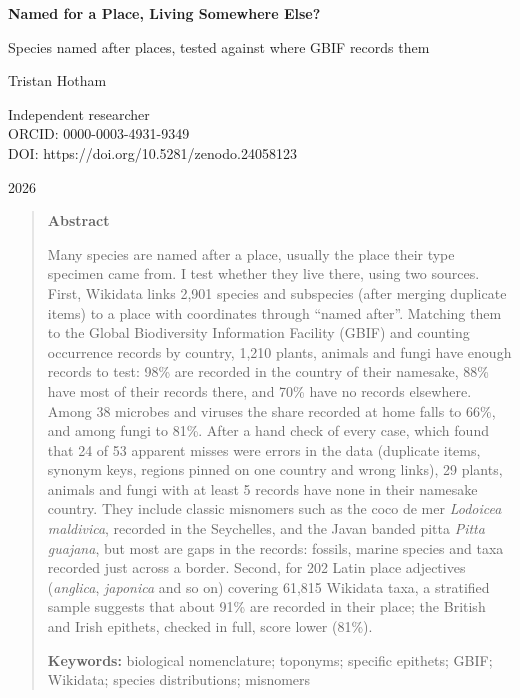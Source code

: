 \documentclass[11pt,a4paper]{article}
\begin{document}
\begin{center}
{\Large\bfseries Named for a Place, Living Somewhere Else?\par}
\vspace{0.4em}
{\large Species named after places, tested against where GBIF records them\par}
\vspace{1.2em}
{\large Tristan Hotham\par}
\vspace{0.3em}
{\small Independent researcher\\
ORCID: 0000-0003-4931-9349\\
DOI: https://doi.org/10.5281/zenodo.24058123\par}
\vspace{0.8em}
2026
\end{center}

\begin{quote}
\small
\begin{center}\textbf{Abstract}\end{center}
Many species are named after a place, usually the place their type specimen came from. I test whether they live there, using two sources. First, Wikidata links 2,901 species and subspecies (after merging duplicate items) to a place with coordinates through ``named after''. Matching them to the Global Biodiversity Information Facility (GBIF) and counting occurrence records by country, 1,210 plants, animals and fungi have enough records to test: 98\% are recorded in the country of their namesake, 88\% have most of their records there, and 70\% have no records elsewhere. Among 38 microbes and viruses the share recorded at home falls to 66\%, and among fungi to 81\%. After a hand check of every case, which found that 24 of 53 apparent misses were errors in the data (duplicate items, synonym keys, regions pinned on one country and wrong links), 29 plants, animals and fungi with at least 5 records have none in their namesake country. They include classic misnomers such as the coco de mer \textit{Lodoicea maldivica}, recorded in the Seychelles, and the Javan banded pitta \textit{Pitta guajana}, but most are gaps in the records: fossils, marine species and taxa recorded just across a border. Second, for 202 Latin place adjectives (\textit{anglica}, \textit{japonica} and so on) covering 61,815 Wikidata taxa, a stratified sample suggests that about 91\% are recorded in their place; the British and Irish epithets, checked in full, score lower (81\%).

\textbf{Keywords:} biological nomenclature; toponyms; specific epithets; GBIF; Wikidata; species distributions; misnomers
\end{quote}
\end{document}
